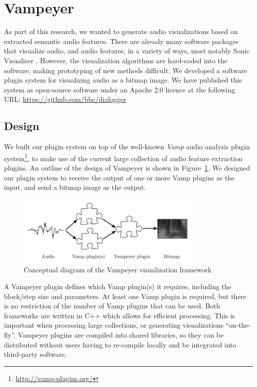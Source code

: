 \clearpage
\section{Vampeyer}\label{sec:vampeyer}
As part of this research, we wanted to generate audio visualizations based on extracted semantic audio features.  There
are already many software packages that visualize audio, and audio features, in a variety of ways, most notably Sonic
Visualiser \citep{Cannam2010}.  However, the visualization algorithms are hard-coded into the software, making
prototyping of new methods difficult.  We developed a software plugin system for visualizing audio as a bitmap image.
We have published this system as open-source software under an Apache 2.0 licence at the following URL:
\url{https://github.com/bbc/dialogger}

\subsection{Design}
We built our plugin system on top of the well-known \textit{Vamp} audio analysis plugin
system\footnote{\url{http://vamp-plugins.org/}}, to make use of the current large collection of audio feature
extraction plugins.  An outline of the design of Vampeyer is shown in Figure~\ref{fig:vampeyer}.  We designed our
plugin system to receive the output of one or more Vamp plugins as the input, and send a bitmap image as the output.

\begin{figure}[ht]
  \centering
  \includegraphics[width=0.8\textwidth]{figs/vampeyer.pdf}
  \caption{Conceptual diagram of the Vampeyer visualization framework}
  \label{fig:vampeyer}
\end{figure}

A Vampeyer plugin defines which Vamp plugin(s) it requires, including the block/step size and parameters.  At least one
Vamp plugin is required, but there is no restriction of the number of Vamp plugins that can be used.  Both
frameworks are written in C++ which allows for efficient processing.  This is important when processing large
collections, or generating visualizations ``on-the-fly''.  Vampeyer plugins are compiled into shared libraries, so they can
be distributed without users having to re-compile locally and be integrated into third-party software.


